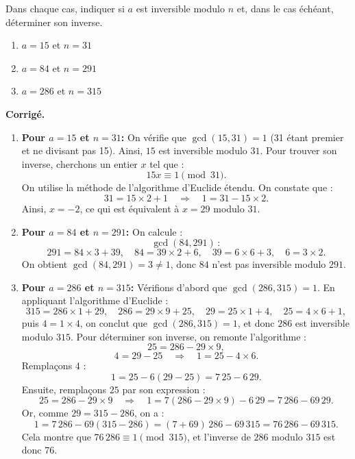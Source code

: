 \documentclass[a4paper,11pt]{article}
\newenvironment{corrige}[1][Corrigé]{%
  \par\noindent\textbf{#1.}%
  \begin{itshape}}%
  {\end{itshape}\par}
\begin{document}
\begin{exercice}[title=Exercice 24 $\quad \star \quad$ { [Calculer] }]{}{}
    Dans chaque cas, indiquer si $a$ est inversible modulo $n$ et, dans le cas échéant, déterminer son inverse.
    \begin{enumerate}
        \item $a = 15$ et $n = 31$
        \item $a = 84$ et $n = 291$
        \item $a = 286$ et $n = 315$
    \end{enumerate}
    \end{exercice}
    
    \begin{corrige}
    \begin{enumerate}
        \item \textbf{Pour $a=15$ et $n=31$:}  
        On vérifie que $\gcd(15,31)=1$ (31 étant premier et ne divisant pas 15). Ainsi, $15$ est inversible modulo $31$.  
        Pour trouver son inverse, cherchons un entier $x$ tel que :
        \[
        15x \equiv 1 \pmod{31}.
        \]
        On utilise la méthode de l'algorithme d'Euclide étendu. On constate que :
        \[
        31 = 15 \times 2 + 1 \quad \Longrightarrow \quad 1 = 31 - 15 \times 2.
        \]
        Ainsi, $x=-2$, ce qui est équivalent à $x=29$ modulo $31$.  
        \medskip
    
        \item \textbf{Pour $a=84$ et $n=291$:}  
        On calcule :
        \[
        \gcd(84,291) \,:
        \]
        \[
        291 = 84 \times 3 + 39,\quad 84 = 39 \times 2 + 6,\quad 39 = 6 \times 6 + 3,\quad 6 = 3 \times 2.
        \]
        On obtient $\gcd(84,291)=3\neq 1$, donc $84$ n'est pas inversible modulo $291$.  
        \medskip
    
        \item \textbf{Pour $a=286$ et $n=315$:}  
        Vérifions d'abord que $\gcd(286,315)=1$. En appliquant l'algorithme d'Euclide :
        \[
        315 = 286 \times 1 + 29,\quad 286 = 29 \times 9 + 25,\quad 29 = 25 \times 1 + 4,\quad 25 = 4 \times 6 + 1,
        \]
        puis $4 = 1 \times 4$, on conclut que $\gcd(286,315)=1$, et donc $286$ est inversible modulo $315$.  
        Pour déterminer son inverse, on remonte l'algorithme :
        \[
        25 = 286 - 29 \times 9,
        \]
        \[
        4 = 29 - 25 \quad \Longrightarrow \quad 1 = 25 - 4 \times 6.
        \]
        Remplaçons $4$ :
        \[
        1 = 25 - 6(29 - 25) = 7\,25 - 6\,29.
        \]
        Ensuite, remplaçons $25$ par son expression :
        \[
        25 = 286 - 29 \times 9 \quad \Longrightarrow \quad 1 = 7(286 - 29 \times 9) - 6\,29 = 7\,286 - 69\,29.
        \]
        Or, comme $29 = 315 - 286$, on a :
        \[
        1 = 7\,286 - 69(315 - 286) = (7+69)\,286 - 69\,315 = 76\,286 - 69\,315.
        \]
        Cela montre que $76\,286 \equiv 1 \pmod{315}$, et l'inverse de $286$ modulo $315$ est donc $76$.
    \end{enumerate}
    \end{corrige}
    
\end{document}
